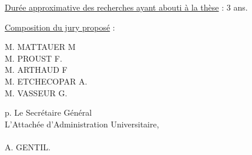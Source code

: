 \uline{Durée approximative des recherches ayant abouti à la thèse} : 3 ans.

\uline{Composition du jury proposé} :

\begin{flushleft}
M. MATTAUER M\\
M. PROUST F.\\
M. ARTHAUD F\\
M. ETCHECOPAR A.\\
M. VASSEUR G.
\end{flushleft}

\begin{flushright}
p. Le Secrétaire Général\\
L'Attachée d'Administration Universitaire,\\
\uline{}\\
A. GENTIL.
\end{flushright}

